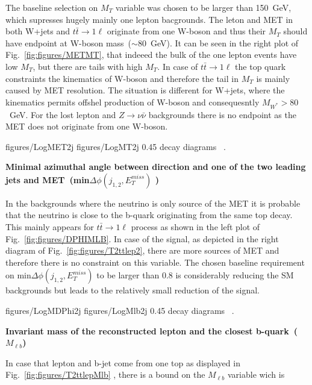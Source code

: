 The baseline selection on  $M_{T}$ variable was chosen to be  larger than 150~GeV, which supresses hugely mainly one lepton bacgrounds. The leton and MET in both  W+jets and $t \bar{t} \to 1\ell$ originate from one W-boson and thus their $M_{T}$ should have endpoint at W-boson mass~($\sim$80~GeV). It can be seen in the right plot of Fig.~\ref{fig:figures/METMT}, that indeeed the bulk of the one lepton events have low $M_{T}$, but there are tails with high $M_{T}$. In case of $t \bar{t} \to 1\ell$ the top quark constraints the kinematics of W-boson and therefore the tail in $M_{T}$  is mainly caused by MET resolution. The situation is different for W+jets, where the kinematics permits offshel production of W-boson and consequesntly $M_{W^{*}}> 80$~GeV. For the lost lepton and $Z \to \nu \bar{\nu}$ backgrounds there is no endpoint as the MET does not originate from one W-boson.

                 {figures/LogMET2j} %
                 {figures/LogMT2j} %
                 {0.45}       %
                 { decay diagrams ~\cite{website:stopSupp}. }

\textbf{Minimal azimuthal angle between direction and  one of the two leading jets and MET~(min$\Delta \phi (j_{1,2}, E_{T}^{miss})$ )}

In the backgrounds where the neutrino is only source of the MET it is probable that the neutrino is close to the b-quark  originating from the same top decay. This mainly appears for $t\bar{t} \to 1\ell$ process as shown in the left plot of Fig.~\ref{fig:figures/DPHIMLB}. In case of the signal, as depicted in the right diagram of Fig.~\ref{fig:figures/T2ttlep2}, there are more sources of MET and therefore there is no constraint on this variable. The chosen baseline requirement on min$\Delta \phi (j_{1,2}, E_{T}^{miss})$ to be larger than 0.8 is considerably reducing the SM backgrounds but leads to the relatively small reduction of the signal.

                 {figures/LogMDPhi2j} %
                 {figures/LogMlb2j} %
                 {0.45}       %
                 { decay diagrams ~\cite{website:stopSupp}. }

\textbf{Invariant mass of the reconstructed lepton and the closest b-quark~($M_{\ell b}$)}

In case that lepton and b-jet come from one top as displayed in Fig.~\ref{fig:figures/T2ttlepMlb} , there is a bound on the $M_{\ell b}$ variable wich is

